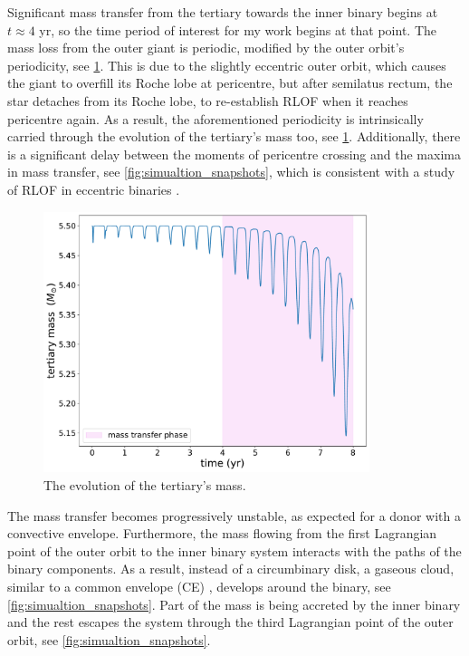 Significant mass transfer from the tertiary towards the inner binary begins at $t \approx 4$ yr, so the time period of interest for my work begins at that point. The mass loss from the outer giant is periodic, modified by the outer orbit's periodicity, see \cref{fig:accretion_inc_00_mass_loss}. This is due to the slightly eccentric outer orbit, which causes the giant to overfill its Roche lobe at pericentre, but after semilatus rectum, the star detaches from its Roche lobe, to re-establish RLOF when it reaches pericentre again. As a result, the aforementioned periodicity is intrinsically carried through the evolution of the tertiary's mass too, see \cref{fig:accretion_inc_00_mass_loss}. Additionally, there is a significant delay between the moments of pericentre crossing and the maxima in mass transfer, see \cref{fig:simualtion_snapshots}, which is consistent with a study of RLOF in eccentric binaries \citep{lajoie2010mass}.
\begin{figure}[!htb]
    \centering
    \includegraphics[width=0.85\textwidth]{Thesis/graphs/inc_00/accretion_inc_00_mass_loss.pdf}
    \caption{The evolution of the tertiary's mass.}
    \label{fig:accretion_inc_00_mass_loss}
\end{figure}
The mass transfer becomes progressively unstable, as expected for a donor with a convective envelope. Furthermore, the mass flowing from the first Lagrangian point of the outer orbit to the inner binary system interacts with the paths of the binary components. As a result, instead of a circumbinary disk, a gaseous cloud, similar to a common envelope (CE) \citep{ivanova2013common}, develops around the binary, see \cref{fig:simualtion_snapshots}. Part of the mass is being accreted by the inner binary and the rest escapes the system through the third Lagrangian point of the outer orbit, see \cref{fig:simualtion_snapshots}.

